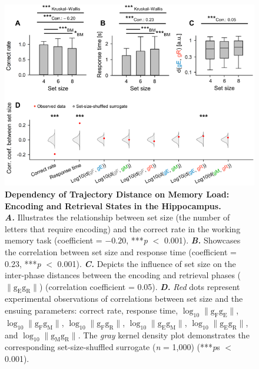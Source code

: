 \documentclass[final,3p,times,twocolumn]{elsarticle}
\begin{document}
        \clearpage
        \begin{figure}[ht]
        	\centering
            \includegraphics[width=1\textwidth]{./src/figures/.png/Figure_ID_03.png}
        	\caption{\textbf{
Dependency of Trajectory Distance on Memory Load: Encoding and Retrieval States in the Hippocampus.
}
\smallskip
\\
\textbf{\textit{A.}} Illustrates the relationship between set size (the number of letters that require encoding) and the correct rate in the working memory task (coefficient = $-0.20$, ***\textit{p} $<$ 0.001). \textbf{\textit{B.}} Showcases the correlation between set size and response time (coefficient = 0.23, ***\textit{p} $<$ 0.001). \textbf{\textit{C.}} Depicts the influence of set size on the inter-phase distances between the encoding and retrieval phases ($\lVert \mathrm{g_{E}g_{R}} \rVert$) (correlation coefficient = 0.05). \textbf{\textit{D.}} \textit{Red} dots represent experimental observations of correlations between set size and the ensuing parameters: correct rate, response time, $\log_{10}{\lVert \mathrm{g_{F}g_{E}} \rVert}$, $\log_{10}{\lVert \mathrm{g_{F}g_{M}} \rVert}$, $\log_{10}{\lVert \mathrm{g_{F}g_{R}} \rVert}$, $\log_{10}{\lVert \mathrm{g_{E}g_{M}} \rVert}$, $\log_{10}{\lVert \mathrm{g_{E}g_{R}} \rVert}$, and $\log_{10}{\lVert \mathrm{g_{M}g_{R}} \rVert}$. The \textit{gray} kernel density plot demonstrates the corresponding set-size-shuffled surrogate (\textit{n} = 1,000) (***\textit{p}s $<$ 0.001).
}
        	\label{fig:03}
        \end{figure}
        \clearpage
\end{document}

